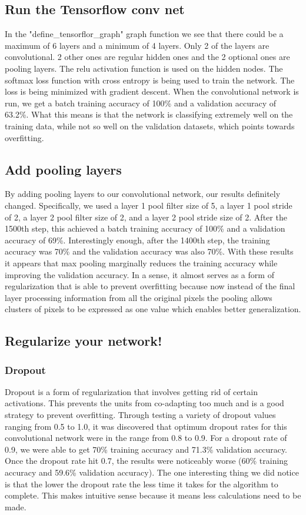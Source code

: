 \documentclass{article}
\begin{document}
\subsection{Run the Tensorflow conv net}
In the "define\_tensorflor\_graph" graph function we see that there could be a maximum of 6 layers and a minimum of 4 layers. Only 2 of the layers are convolutional. 2 other ones are regular hidden ones and the 2 optional ones are pooling layers. The relu activation function is used on the hidden nodes. The softmax loss function with cross entropy is being used to train the network. The loss is being minimized with gradient descent. When the convolutional network is run, we get a batch training accuracy of 100\% and a validation accuracy of 63.2\%. What this means is that the network is classifying extremely well on the training data, while not so well on the validation datasets, which points towards overfitting.

\subsection{Add pooling layers}
By adding pooling layers to our convolutional network, our results definitely changed. Specifically, we used a layer 1 pool filter size of 5, a layer 1 pool stride of 2, a layer 2 pool filter size of 2, and a layer 2 pool stride size of 2. After the 1500th step, this achieved a batch training accuracy of 100\% and a validation accuracy of 69\%. Interestingly enough, after the 1400th step, the training accuracy was 70\% and the validation accuracy was also 70\%. With these results it appears that max pooling marginally reduces the training accuracy while improving the validation accuracy. In a sense, it almost serves as a form of regularization that is able to prevent overfitting because now instead of the final layer processing information from all the original pixels the pooling allows clusters of pixels to be expressed as one value which enables better generalization.

\subsection{Regularize your network!}
\subsubsection{Dropout}
Dropout is a form of regularization that involves getting rid of certain activations. This prevents the units from co-adapting too much and is a good strategy to prevent overfitting. Through testing a variety of dropout values ranging from 0.5 to 1.0, it was discovered that optimum dropout rates for this convolutional network were in the range from 0.8 to 0.9. For a dropout rate of 0.9, we were able to get 70\% training accuracy and 71.3\% validation accuracy. Once the dropout rate hit 0.7, the results were noticeably worse (60\% training accuracy and 59.6\% validation accuracy). The one interesting thing we did notice is that the lower the dropout rate the less time it takes for the algorithm to complete. This makes intuitive sense because it means less calculations need to be made.
\end{document}
